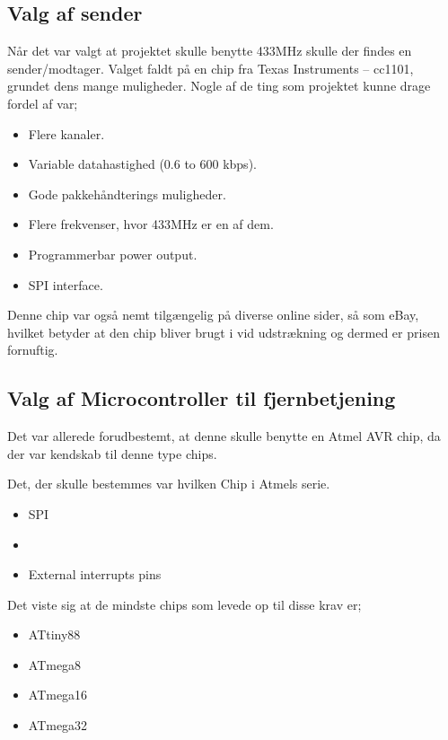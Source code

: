 \documentclass[Main]{subfiles}
\begin{document}
\subsection{Valg af sender}

Når det var valgt at projektet skulle benytte 433MHz skulle der findes en sender/modtager.
Valget faldt på en chip fra Texas Instruments -- cc1101\cite{TI-cc1101}, grundet dens mange muligheder.
Nogle af de ting som projektet kunne drage fordel af var;

\begin{itemize}
\item Flere kanaler.
\item Variable datahastighed (0.6 to 600 kbps).
\item Gode pakkehåndterings muligheder. 
\item Flere frekvenser, hvor 433MHz er en af dem.
\item Programmerbar power output.
\item SPI interface.
\end{itemize}

Denne chip var også nemt tilgængelig på diverse online sider, så som eBay\cite{eBay}, hvilket betyder at den chip bliver brugt i vid udstrækning og dermed er prisen fornuftig.




\subsection{Valg af Microcontroller til fjernbetjening}

Det var allerede forudbestemt, at denne skulle benytte en Atmel AVR chip, da der var kendskab til denne type chips.

Det, der skulle bestemmes var hvilken Chip i Atmels serie.

\begin{itemize}
\item SPI
\item \itoc
\item External interrupts pins
\end{itemize}

Det viste sig at de mindste chips som levede op til disse krav er;

\begin{itemize}
\item ATtiny88
\item ATmega8
\item ATmega16
\item ATmega32
\end{itemize}
\end{document}
